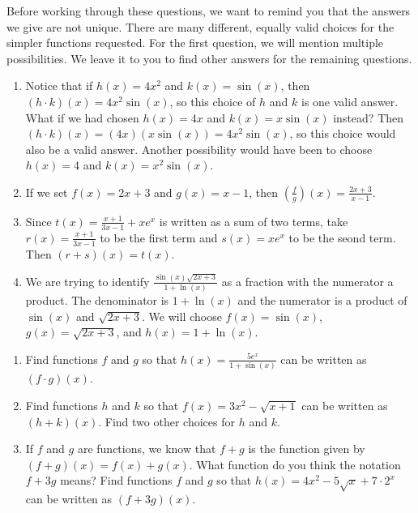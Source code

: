 \documentclass{ximera}
\begin{document}
\begin{example}
\begin{explanation}
			Before working through these questions, we want to remind you that the answers we give are not unique. There are many different, 
			equally valid choices for the simpler functions requested. For the first question, we will mention multiple possibilities. We leave it to you
			to find other answers for the remaining questions.
			\begin{enumerate}	
				\item Notice that if $h(x) = 4x^2$ and $k(x) = \sin(x)$, then $\left( h \cdot k \right)(x) = 4x^2 \sin(x)$, so this choice of $h$ and $k$ 
					is one valid answer. What if we had chosen $h(x) = 4x$ and $k(x) = x\sin(x)$ instead? Then 
					$\left( h \cdot k\right)(x) = (4x)(x\sin(x))=4x^2 \sin(x)$, so this choice would also be a valid answer. Another possibility
					would have been to choose $h(x) = 4$ and $k(x) = x^2 \sin(x)$. \\
				\item If we set $f(x) = 2x+3$ and $g(x) = x-1$, then $\left(\frac{f}{g}\right)(x) = \frac{2x+3}{x-1}$.\\
				\item Since $t(x) = \frac{x+1}{3x-1} + xe^x$ is written as a sum of two terms, take $r(x) = \frac{x+1}{3x-1}$ to be the first term
					and $s(x) = xe^x$ to be the seond term. Then $(r+s)(x) = t(x)$.
				\item We are trying to identify $ \frac{\sin(x) \sqrt{2x+3}}{1+\ln(x)}$ as a fraction with the numerator a product. The denominator is 
					$1 + \ln(x)$ and the numerator is a product of $\sin(x)$ and $\sqrt{2x+3}$. We will choose $f(x) = \sin(x)$, 
					$g(x) = \sqrt{2x+3}$, and $h(x) = 1 + \ln(x)$.
			\end{enumerate}
		\end{explanation}
	\end{example}
	
	\begin{exploration}
		\begin{enumerate}
			\item Find functions $f$ and $g$ so that $h(x) = \frac{5 e^x}{1+\sin(x)}$ can be written as $\left(f \cdot g\right)(x)$.\\
			\item Find functions $h$ and $k$ so that $f(x) = 3x^2 - \sqrt{x+1}$ can be written as $(h + k)(x)$. Find two other choices for $h$ and $k$.\\
			\item If $f$ and $g$ are functions, we know that $f+g$ is the function given by $(f+g)(x) = f(x)+g(x)$. What function do you think the 
				notation $f + 3g$ means? Find functions $f$ and $g$ so that $h(x) = 4x^2-5\sqrt{x} + 7\cdot 2^x$ can be written as 
				$\left( f + 3g\right)(x)$.\\
		\end{enumerate}
	\end{exploration}
	

\end{document}
